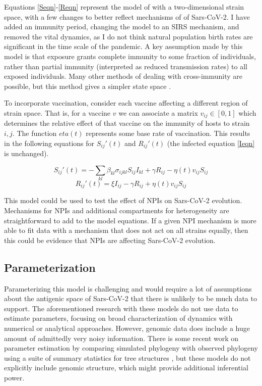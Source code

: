 \documentclass{article}
\begin{document}
    

Equations \ref{Seqn}-\ref{Reqn} represent the model of \cite{gogDynamicsSelectionManystrain2002} with a two-dimensional strain space, with a few changes to better reflect mechanisms of of Sars-CoV-2. I have added an immunity period, changing the model to an SIRS mechanism, and removed the vital dynamics, as I do not think natural population birth rates are significant in the time scale of the pandemic. A key assumption made by this model is that exposure grants complete immunity to some fraction of individuals, rather than partial immunity (interpreted as reduced transmission rates) to all exposed individuals. Many other methods of dealing with cross-immunity are possible, but this method gives a simpler state space \cite{Castillo_Chavez_Blower_Driessche_Kirschner_Yakubu_2002}.


To incorporate vaccination, consider each vaccine affecting a different region of strain space. That is, for a vaccine $v$ we can associate a matrix $v_{ij} \in [0,1]$ which determines the relative effect of that vaccine on the immunity of hosts to strain $i,j$. The function $eta(t)$ represents some base rate of vaccination. This results in the following equations for $S_{ij}'(t)$ and $ R_{ij}'(t) $ (the infected equation \ref{Ieqn} is unchanged).


\begin{equation}
    S_{ij}'(t) = -\sum_{kl} \beta_{kl} \sigma_{ijkl} S_{ij} I_{kl} + \gamma R_{ij} -  \eta(t) v_{ij} S_{ij} \label{Seqn}
\end{equation}
\begin{equation}
    R_{ij}'(t) = \xi I_{ij} - \gamma R_{ij} + \eta(t) v_{ij} S_{ij} \label{Reqn}
\end{equation}


This model could be used to test the effect of NPIs on Sars-CoV-2 evolution. Mechanisms for NPIs and additional compartments for heterogeneity are straightforward to add to the model equations. If a given NPI mechanism is more able to fit data with a mechanism that does not act on all strains equally, then this could be evidence that NPIs are affecting Sars-CoV-2 evolution. 


\subsection{Parameterization}

Parameterizing this model is challenging and would require a lot of assumptions about the antigenic space of Sars-CoV-2 that there is unlikely to be much data to support. The aforementioned research with these models do not use data to estimate parameters, focusing on broad characterization of dynamics with numerical or analytical approaches. However, genomic data does include a huge amount of admittedly very noisy information. There is some recent work on parameter estimation by comparing simulated phylogeny with observed phylogeny using a suite of summary statistics for tree structures \cite{danesh2021quantifying,leventhal2012inferring,saulnier2017inferring}, but these models do not explicitly include genomic structure, which might provide additional inferential power.
\end{document}
